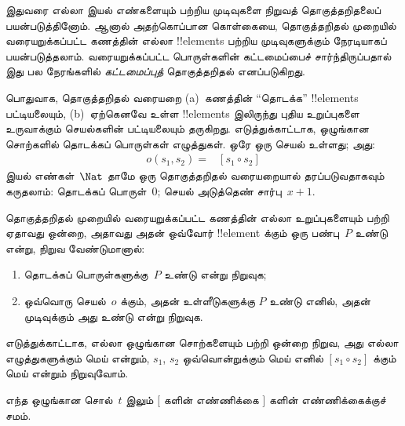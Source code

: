 \documentclass[../../../include/open-logic-section]{subfiles}
\begin{document}


இதுவரை எல்லா இயல் எண்களையும் பற்றிய முடிவுகளை
நிறுவத் தொகுத்தறிதலைப் பயன்படுத்தினோம். ஆனால்
அதற்கொப்பான கொள்கையை, தொகுத்தறிதல் முறையில்
வரையறுக்கப்பட்ட கணத்தின் எல்லா !!{element}s பற்றிய
முடிவுகளுக்கும் நேரடியாகப் பயன்படுத்தலாம். வரையறுக்கப்பட்ட
பொருள்களின் கட்டமைப்பைச் சார்ந்திருப்பதால் இது பல
நேரங்களில் \emph{கட்டமைப்புத்} தொகுத்தறிதல் எனப்படுகிறது.

பொதுவாக, தொகுத்தறிதல் வரையறை (a)~கணத்தின்
``தொடக்க'' !!{element}s பட்டியலையும்,
(b)~ஏற்கெனவே உள்ள !!{element}s இலிருந்து
புதிய உறுப்புகளை உருவாக்கும் செயல்களின்
பட்டியலையும் தருகிறது. எடுத்துக்காட்டாக, ஒழுங்கான
சொற்களில் தொடக்கப் பொருள்கள் எழுத்துகள்.
ஒரே ஒரு செயல் உள்ளது; அது:
\begin{align*}
  o(s_1, s_2) = & [s_1 \circ s_2]
\end{align*}
இயல் எண்கள்~$\Nat$ தாமே ஒரு தொகுத்தறிதல்
வரையறையால் தரப்படுவதாகவும் கருதலாம்: தொடக்கப்
பொருள்~$0$; செயல் அடுத்தெண் சார்பு~$x + 1$.

தொகுத்தறிதல் முறையில் வரையறுக்கப்பட்ட கணத்தின்
எல்லா உறுப்புகளையும் பற்றி ஏதாவது ஒன்றை,
அதாவது அதன் ஒவ்வோர் !!{element} க்கும்
ஒரு பண்பு~$P$ உண்டு என்று, நிறுவ
வேண்டுமானால்:
\begin{enumerate}
\item தொடக்கப் பொருள்களுக்கு~$P$ உண்டு என்று நிறுவுக;
\item ஒவ்வொரு செயல்~$o$ க்கும், அதன் உள்ளீடுகளுக்கு
  $P$ உண்டு எனில், அதன் முடிவுக்கும் அது உண்டு
  என்று நிறுவுக.
\end{enumerate}
எடுத்துக்காட்டாக, எல்லா ஒழுங்கான சொற்களையும்
பற்றி ஒன்றை நிறுவ, அது எல்லா எழுத்துகளுக்கும்
மெய் என்றும், $s_1$, $s_2$ ஒவ்வொன்றுக்கும்
மெய் எனில் $[s_1 \circ s_2]$ க்கும்
மெய் என்றும் நிறுவுவோம்.

\begin{prop}
  எந்த ஒழுங்கான சொல்~$t$ இலும் $[$
  களின் எண்ணிக்கை $]$ களின் எண்ணிக்கைக்குச் சமம்.
\end{prop}
\end{document}
